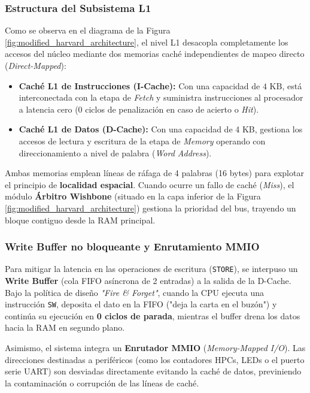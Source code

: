 \documentclass[10pt,a4paper]{article}
\begin{document}
\shorthandon{<>}

\subsubsection{Estructura del Subsistema L1}
Como se observa en el diagrama de la Figura \ref{fig:modified_harvard_architecture}, el nivel L1 desacopla completamente los accesos del núcleo mediante dos
memorias caché independientes de mapeo directo (\textit{Direct-Mapped}):

\begin{itemize}
    \item \textbf{Caché L1 de Instrucciones (I-Cache):} Con una capacidad de $4\text{ KB}$, está interconectada con la etapa de \textit{Fetch} y suministra instrucciones al procesador a latencia cero
    (0 ciclos de penalización en caso de acierto o \textit{Hit}).
    \item \textbf{Caché L1 de Datos (D-Cache):} Con una capacidad de 4 KB, gestiona los accesos de lectura y escritura de la etapa de \textit{Memory} operando
    con direccionamiento a nivel de palabra (\textit{Word Address}).
\end{itemize}

Ambas memorias emplean líneas de ráfaga de 4 palabras (16 bytes) para explotar el principio de \textbf{localidad espacial}. Cuando ocurre un fallo de caché
(\textit{Miss}), el módulo \textbf{Árbitro Wishbone} (situado en la capa inferior de la Figura \ref{fig:modified_harvard_architecture}) gestiona la prioridad
del bus, trayendo un bloque contiguo desde la RAM principal.

\subsubsection{Write Buffer no bloqueante y Enrutamiento MMIO}
Para mitigar la latencia en las operaciones de escritura (\texttt{STORE}), se interpuso un \textbf{Write Buffer} (cola FIFO asíncrona de 2 entradas) a la
salida de la D-Cache. Bajo la política de diseño \textit{"Fire \& Forget"}, cuando la CPU ejecuta una instrucción \texttt{SW}, deposita el dato en la FIFO
("deja la carta en el buzón") y continúa su ejecución en \textbf{0 ciclos de parada}, mientras el buffer drena los datos hacia la RAM en segundo plano.

Asimismo, el sistema integra un \textbf{Enrutador MMIO} (\textit{Memory-Mapped I/O}). Las direcciones destinadas a periféricos (como los contadores HPCs, LEDs o
el puerto serie UART) son desviadas directamente evitando la caché de datos, previniendo la contaminación o corrupción de las líneas de caché.
\end{document}

